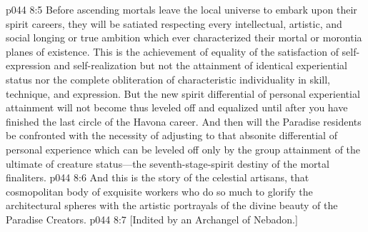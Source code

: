 \vs p044 8:5 Before ascending mortals leave the local universe to embark upon their spirit careers, they will be satiated respecting every intellectual, artistic, and social longing or true ambition which ever characterized their mortal or morontia planes of existence. This is the achievement of equality of the satisfaction of self\hyp{}expression and self\hyp{}realization but not the attainment of identical experiential status nor the complete obliteration of characteristic individuality in skill, technique, and expression. But the new spirit differential of personal experiential attainment will not become thus leveled off and equalized until after you have finished the last circle of the Havona career. And then will the Paradise residents be confronted with the necessity of adjusting to that absonite differential of personal experience which can be leveled off only by the group attainment of the ultimate of creature status---the seventh\hyp{}stage\hyp{}spirit destiny of the mortal finaliters.\plusone
\pc \vs p044 8:6 And this is the story of the celestial artisans, that cosmopolitan body of exquisite workers who do so much to glorify the architectural spheres with the artistic portrayals of the divine beauty of the Paradise Creators.
\vsetoff
\vs p044 8:7 [Indited by an Archangel of Nebadon.]
